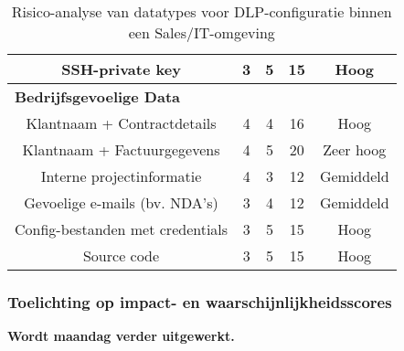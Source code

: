 \begin{table}[h]
\begin{tabular}{|c|c|c|c|c|}
    SSH-private key             & 3 & 5 & 15 & Hoog \\
    \hline
    \multicolumn{5}{|l|}{\textbf{Bedrijfsgevoelige Data}} \\
    \hline
    Klantnaam + Contractdetails & 4 & 4 & 16 & Hoog \\
    Klantnaam + Factuurgegevens & 4 & 5 & 20 & Zeer hoog \\
    Interne projectinformatie   & 4 & 3 & 12 & Gemiddeld \\
    Gevoelige e-mails (bv. NDA's) & 3 & 4 & 12 & Gemiddeld \\
    Config-bestanden met credentials & 3 & 5 & 15 & Hoog \\
    Source code                 & 3 & 5 & 15 & Hoog \\
    \hline
    \end{tabular}
    \caption{Risico-analyse van datatypes voor DLP-configuratie binnen een Sales/IT-omgeving}
    \label{tab:datatypes_risico_uitgebreid}
\end{table}


\subsubsection{Toelichting op impact- en waarschijnlijkheidsscores}
\label{sec:toelichting_scores}

\textbf{Wordt maandag verder uitgewerkt.}




